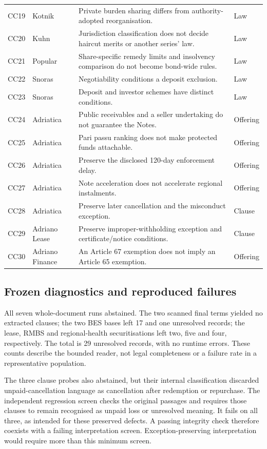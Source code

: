 {\begin{longtable}{P{0.07\textwidth}P{0.18\textwidth}P{0.50\textwidth}P{0.10\textwidth}}
CC19 & Kotnik & Private burden sharing differs from authority-adopted reorganisation. & Law \\
CC20 & Kuhn & Jurisdiction classification does not decide haircut merits or another series' law. & Law \\
CC21 & Popular & Share-specific remedy limits and insolvency comparison do not become bond-wide rules. & Law \\
CC22 & Snoras & Negotiability conditions a deposit exclusion. & Law \\
CC23 & Snoras & Deposit and investor schemes have distinct conditions. & Law \\
CC24 & Adriatica & Public receivables and a seller undertaking do not guarantee the Notes. & Offering \\
CC25 & Adriatica & Pari passu ranking does not make protected funds attachable. & Offering \\
CC26 & Adriatica & Preserve the disclosed 120-day enforcement delay. & Offering \\
CC27 & Adriatica & Note acceleration does not accelerate regional instalments. & Offering \\
CC28 & Adriatica & Preserve later cancellation and the misconduct exception. & Clause \\
CC29 & Adriano Lease & Preserve improper-withholding exception and certificate/notice conditions. & Clause \\
CC30 & Adriano Finance & An Article 67 exemption does not imply an Article 65 exemption. & Offering \\
\bottomrule
\end{longtable}
}

\subsection{Frozen diagnostics and reproduced failures}

All seven whole-document runs abstained. The two scanned final terms yielded
no extracted clauses; the two BES bases left 17 and one unresolved records;
the lease, RMBS and regional-health securitisations left two, five and four,
respectively. The total is 29 unresolved records, with no runtime errors.
These counts describe the bounded reader, not legal completeness or a failure
rate in a representative population.

The three clause probes also abstained, but their internal classification
discarded unpaid-cancellation language as cancellation after redemption or
repurchase. The independent regression screen checks the original passages
and requires those clauses to remain recognised as unpaid loss or unresolved
meaning. It fails on all three, as intended for these preserved defects.
A passing integrity check therefore coexists with a failing interpretation
screen. Exception-preserving interpretation would require more than this
minimum screen.

